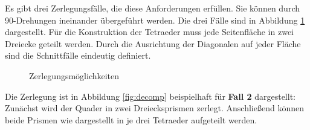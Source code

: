 Es gibt drei Zerlegungsfälle, die diese Anforderungen erfüllen. Sie können durch 90\textdegree-Drehungen ineinander übergeführt werden. Die drei Fälle sind in Abbildung \ref{fig:cases} dargestellt. Für die Konstruktion der Tetraeder muss jede Seitenfläche in zwei Dreiecke geteilt werden. Durch die Ausrichtung der Diagonalen auf jeder Fläche sind die Schnittfälle eindeutig definiert.\\

\begin{figure}[ht]
\centering
{}
\qquad
{}
\qquad
{}
\caption{Zerlegungsmöglichkeiten}
\label{fig:cases}
\end{figure}

Die Zerlegung ist in Abbildung \ref{fig:decomp} beispielhaft für \textbf{Fall 2} dargestellt: Zunächst wird der Quader in zwei Dreiecksprismen zerlegt. Anschließend können beide Prismen wie dargestellt in je drei Tetraeder aufgeteilt werden.


